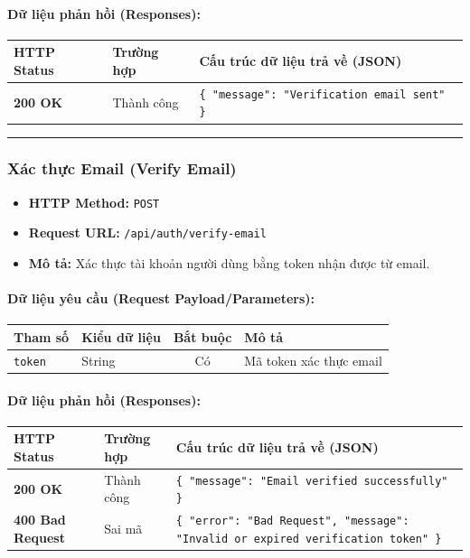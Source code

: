 \documentclass[12pt,a4paper]{article}
\begin{document}
\paragraph{Dữ liệu phản hồi (Responses):}
\begin{longtable}{|p{2.8cm}|p{3.2cm}|p{8.0cm}|}
\hline
\textbf{HTTP Status} & \textbf{Trường hợp} & \textbf{Cấu trúc dữ liệu trả về (JSON)} \\ \hline
\endhead
\textbf{200 OK} & Thành công & \texttt{\{ "message": "Verification email sent" \}} \\ \hline
\end{longtable}

\vskip 0.4cm
\noindent\rule{\textwidth}{0.3pt}
\vskip 0.4cm

\subsubsection{Xác thực Email (Verify Email)}
\begin{itemize}[leftmargin=*]
    \item \textbf{HTTP Method:} \texttt{POST}
    \item \textbf{Request URL:} \texttt{/api/auth/verify-email}
    \item \textbf{Mô tả:} Xác thực tài khoản người dùng bằng token nhận được từ email.
\end{itemize}

\paragraph{Dữ liệu yêu cầu (Request Payload/Parameters):}
\begin{longtable}{|p{2.8cm}|p{2.2cm}|c|p{7.0cm}|}
\hline
\textbf{Tham số} & \textbf{Kiểu dữ liệu} & \textbf{Bắt buộc} & \textbf{Mô tả} \\ \hline
\endhead
\texttt{token} & String & Có & Mã token xác thực email \\ \hline
\end{longtable}

\paragraph{Dữ liệu phản hồi (Responses):}
\begin{longtable}{|p{2.8cm}|p{3.2cm}|p{8.0cm}|}
\hline
\textbf{HTTP Status} & \textbf{Trường hợp} & \textbf{Cấu trúc dữ liệu trả về (JSON)} \\ \hline
\endhead
\textbf{200 OK} & Thành công & \texttt{\{ "message": "Email verified successfully" \}} \\ \hline
\textbf{400 Bad Request} & Sai mã & \texttt{\{ "error": "Bad Request", "message": "Invalid or expired verification token" \}} \\ \hline
\end{longtable}
\end{document}

